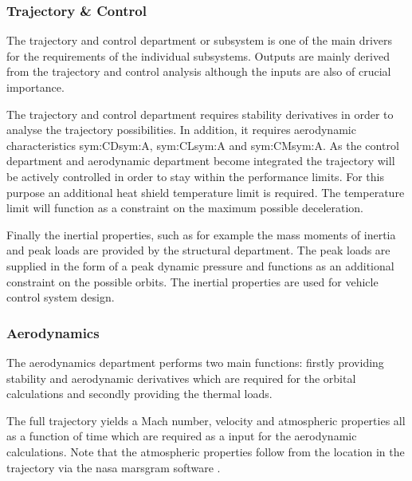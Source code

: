 \subsubsection{Trajectory \& Control}
The trajectory and control department or subsystem is one of the main drivers for the requirements of the individual subsystems. Outputs are mainly derived from the trajectory and control analysis although the inputs are also of crucial importance. 

The trajectory and control department requires stability derivatives in order to analyse the trajectory possibilities. In addition, it requires aerodynamic characteristics \gls{sym:CD}\gls{sym:A}, \gls{sym:CL}\gls{sym:A} and \gls{sym:CM}\gls{sym:A}.
As the control department and aerodynamic department become integrated the trajectory will be actively controlled in order to stay within the performance limits. For this purpose an additional heat shield temperature limit is required. The temperature limit will function as a constraint on the maximum possible deceleration.

Finally the inertial properties, such as for example the mass moments of inertia and peak loads are provided by the structural department. The peak loads are supplied in the form of a peak dynamic pressure and functions as an additional constraint on the possible orbits. The inertial properties are used for vehicle control system design.

\subsubsection{Aerodynamics}
The aerodynamics department performs two main functions: firstly providing stability and aerodynamic derivatives which are required for the orbital calculations and secondly providing the thermal loads. %

The full trajectory yields a Mach number, velocity and atmospheric properties all as a function of time which are required as a input for the aerodynamic calculations. Note that the atmospheric properties follow from the location in the trajectory via the \gls{nasa} \gls{marsgram} software \cite{Justus2001}.

